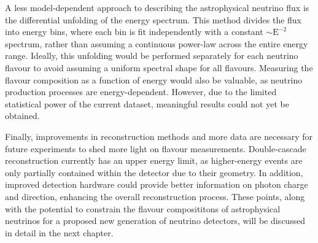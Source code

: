 A less model-dependent approach to describing the astrophysical neutrino flux is the differential unfolding of the energy spectrum. This method divides the flux into energy bins, where each bin is fit independently with a constant $\sim\mathrm{E}^{-2}$ spectrum, rather than assuming a continuous power-law across the entire energy range. Ideally, this unfolding would be performed separately for each neutrino flavour to avoid assuming a uniform spectral shape for all flavours. Measuring the flavour composition as a function of energy would also be valuable, as neutrino production processes are energy-dependent. However, due to the limited statistical power of the current dataset, meaningful results could not yet be obtained.

Finally, improvements in reconstruction methods and more data are necessary for future experiments to shed more light on flavour measurements. Double-cascade reconstruction currently has an upper energy limit, as higher-energy events are only partially contained within the detector due to their geometry. In addition, improved detection hardware could provide better information on photon charge and direction, enhancing the overall reconstruction process. These points, along with the potential to constrain the flavour composititons of astrophysical neutrinos for a proposed new generation of neutrino detectors, will be discussed in detail in the next chapter. 


